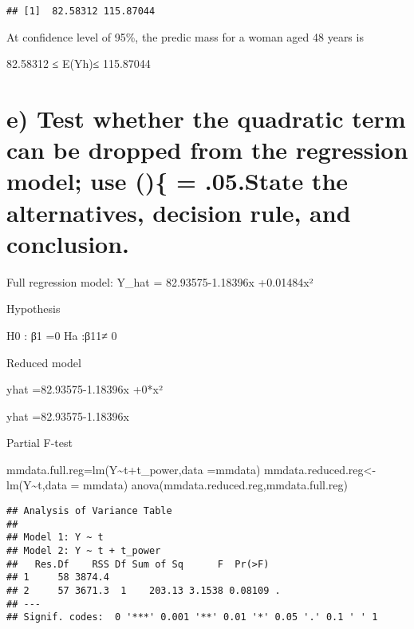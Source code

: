 \documentclass[
]{article}
\newenvironment{Shaded}{\begin{snugshade}}{\end{snugshade}}
\newcommand{\AttributeTok}[1]{\textcolor[rgb]{0.77,0.63,0.00}{#1}}
\newcommand{\FunctionTok}[1]{\textcolor[rgb]{0.00,0.00,0.00}{#1}}
\newcommand{\NormalTok}[1]{#1}
\newcommand{\OtherTok}[1]{\textcolor[rgb]{0.56,0.35,0.01}{#1}}
\newcommand{\SpecialCharTok}[1]{\textcolor[rgb]{0.00,0.00,0.00}{#1}}
\begin{document}
\begin{verbatim}
## [1]  82.58312 115.87044
\end{verbatim}

At confidence level of 95\%, the predic mass for a woman aged 48 years
is

82.58312 ≤ E(Yh)≤ 115.87044

\hypertarget{e-test-whether-the-quadratic-term-can-be-dropped-from-the-regression-model-use-.05.state-the-alternatives-decision-rule-and-conclusion.}{%
\section{e) Test whether the quadratic term can be dropped from the
regression model; use ()\{ = .05.State the alternatives, decision rule,
and
conclusion.}\label{e-test-whether-the-quadratic-term-can-be-dropped-from-the-regression-model-use-.05.state-the-alternatives-decision-rule-and-conclusion.}}

Full regression model: Y\_hat = 82.93575-1.18396x +0.01484x²

Hypothesis

H0 : β1 =0 Ha :β11≠ 0

Reduced model

yhat =82.93575-1.18396x +0*x²

yhat =82.93575-1.18396x

Partial F-test

\begin{Shaded}
\begin{Highlighting}[]
\NormalTok{mmdata.full.reg}\OtherTok{=}\FunctionTok{lm}\NormalTok{(Y}\SpecialCharTok{\textasciitilde{}}\NormalTok{t}\SpecialCharTok{+}\NormalTok{t\_power,}\AttributeTok{data =}\NormalTok{mmdata)}
\NormalTok{mmdata.reduced.reg}\OtherTok{\textless{}{-}} \FunctionTok{lm}\NormalTok{(Y}\SpecialCharTok{\textasciitilde{}}\NormalTok{t,}\AttributeTok{data =}\NormalTok{ mmdata)}
\FunctionTok{anova}\NormalTok{(mmdata.reduced.reg,mmdata.full.reg)}
\end{Highlighting}
\end{Shaded}

\begin{verbatim}
## Analysis of Variance Table
## 
## Model 1: Y ~ t
## Model 2: Y ~ t + t_power
##   Res.Df    RSS Df Sum of Sq      F  Pr(>F)  
## 1     58 3874.4                              
## 2     57 3671.3  1    203.13 3.1538 0.08109 .
## ---
## Signif. codes:  0 '***' 0.001 '**' 0.01 '*' 0.05 '.' 0.1 ' ' 1
\end{verbatim}
\end{document}
